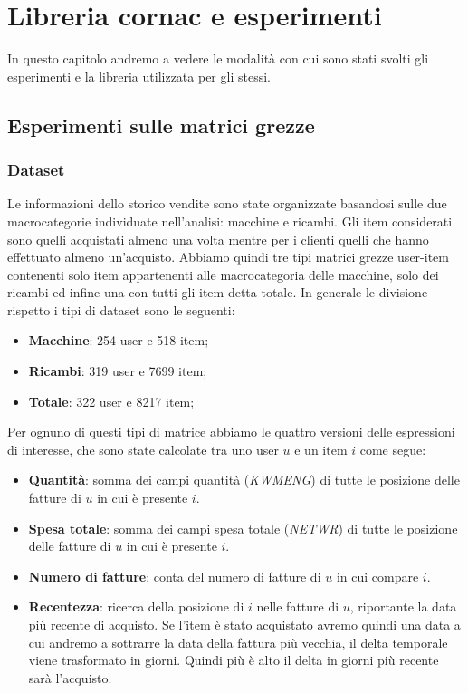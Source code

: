 \hypertarget{(chap:capitolo6)}{}
\chapter{Libreria cornac e esperimenti}
In questo capitolo  andremo a vedere le modalità con cui sono stati svolti gli esperimenti e la libreria utilizzata per gli stessi.
\section{Esperimenti sulle matrici grezze}
\subsection{Dataset}
Le informazioni dello storico vendite sono state organizzate basandosi sulle due macrocategorie individuate nell'analisi: macchine e ricambi.
Gli item considerati sono quelli acquistati almeno una volta mentre per i clienti quelli che hanno effettuato almeno un'acquisto.
Abbiamo quindi tre tipi matrici grezze user-item contenenti solo item appartenenti alle macrocategoria delle macchine, solo dei ricambi ed infine una con tutti gli item detta totale.
In generale le divisione rispetto i tipi di dataset sono le seguenti:
\begin{itemize}
    \item \textbf{Macchine}: 254 user e 518 item;
    \item \textbf{Ricambi}: 319 user e 7699 item;
    \item \textbf{Totale}: 322 user e 8217 item;
\end{itemize}

Per ognuno di questi tipi di matrice abbiamo le quattro versioni delle espressioni di interesse, che sono state calcolate tra uno user $u$ e un item $i$ come segue:
\begin{itemize}
    \item \textbf{Quantità}: somma dei campi quantità (\textit{KWMENG}) di tutte le posizione delle fatture di $u$ in cui è presente $i$.
    \item \textbf{Spesa totale}: somma dei campi spesa totale (\textit{NETWR}) di tutte le posizione delle fatture di $u$ in cui è presente $i$.
    \item \textbf{Numero di fatture}: conta del numero di fatture di $u$ in cui compare $i$.
    \item \textbf{Recentezza}: ricerca della posizione di $i$ nelle fatture di $u$, riportante la data più recente di acquisto. Se l'item è stato acquistato avremo quindi una data a cui andremo a sottrarre la data della fattura più vecchia, il delta temporale viene trasformato in giorni. Quindi più è alto il delta in giorni più recente sarà l'acquisto.
\end{itemize}

